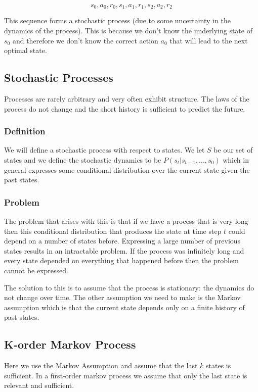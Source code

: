 \documentclass[12pt]{article}
\begin{document}
        $$ s_0, a_0, r_0, s_1, a_1, r_1, s_2, a_2, r_2 $$

        This sequence forms a stochastic process (due to some uncertainty in the dynamics of the process). This is
        because we don't know the underlying state of $s_0$ and therefore we don't know the correct action $a_0$ that
        will lead to the next optimal state. 

    \subsection{Stochastic Processes}
        Processes are rarely arbitrary and very often exhibit structure. The laws of the process do not change and the
        short history is sufficient to predict the future. 

        \subsubsection{Definition}
            We will define a stochastic process with respect to states. We let $S$ be our set of states and we define
            the stochastic dynamics to be $P(s_t | s_{t-1}, ..., s_0)$ which in general expresses some conditional
            distribution over the current state given the past states.

        \subsubsection{Problem}
            The problem that arises with this is that if we have a process that is very long then this conditional
            distribution that produces the state at time step $t$ could depend on a number of states before. Expressing
            a large number of previous states results in an intractable problem. If the process was infinitely long and
            every state depended on everything that happened before then the problem cannot be expressed. 

            The solution to this is to assume that the process is stationary: the dynamics do not change over time. The
            other assumption we need to make is the Markov assumption which is that the current state depends only on a
            finite history of past states. 
        
    \subsection{K-order Markov Process}
        Here we use the Markov Assumption and assume that the last $k$ states is sufficient. In a first-order markov
        process we assume that only the last state is relevant and sufficient.
\end{document}

